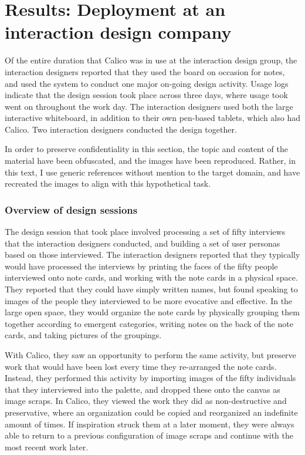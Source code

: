 \section{Results: Deployment at an interaction design company}
\label{chapter:evaluation:deployment2}

Of the entire duration that Calico was in use at the interaction design group, the interaction designers reported that they used the board on occasion for notes, and used the system to conduct one major on-going design activity. Usage logs indicate that the design session took place across three days, where usage took went on throughout the work day. The interaction designers used both the large interactive whiteboard, in addition to their own pen-based tablets, which also had Calico. Two interaction designers conducted the design together.

In order to preserve confidentiality in this section, the topic and content of the material have been obfuscated, and the images have been reproduced. Rather, in this text, I use generic references without mention to the target domain, and have recreated the images to align with this hypothetical task.

\subsubsection{Overview of design sessions}

The design session that took place involved processing a set of fifty interviews that the interaction designers conducted, and building a set of user personas based on those interviewed. The interaction designers reported that they typically would have processed the interviews by printing the faces of the fifty people interviewed onto note cards, and working with the note cards in a physical space. They reported that they could have simply written names, but found speaking to images of the people they interviewed to be more evocative and effective. In the large open space, they would organize the note cards by physically grouping them together according to emergent categories, writing notes on the back of the note cards, and taking pictures of the groupings. 

With Calico, they saw an opportunity to perform the same activity, but preserve work that would have been lost every time they re-arranged the note cards. Instead, they performed this activity by importing images of the fifty individuals that they interviewed into the palette, and dropped these onto the canvas as image scraps. In Calico, they viewed the work they did as non-destructive and preservative, where an organization could be copied and reorganized an indefinite amount of times. If inspiration struck them at a later moment, they were always able to return to a previous configuration of image scraps and continue with the most recent work later.

